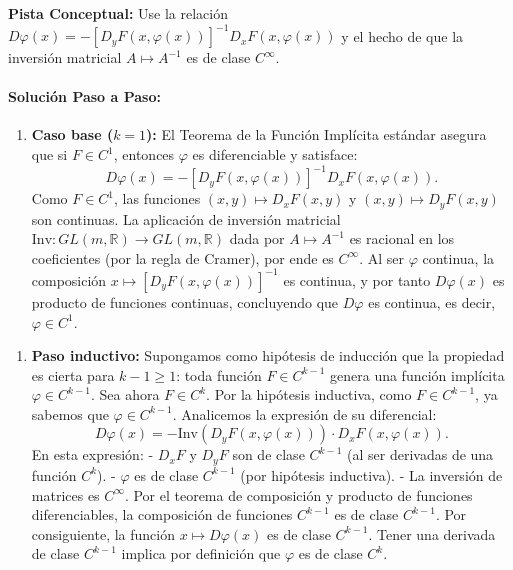 \documentclass[11pt,a4paper]{article}
\begin{document}
\begin{tcolorbox}[colback=yellow!4,colframe=accentamber!70,arc=1mm,boxrule=0.5pt,left=3mm,right=3mm,top=1.5mm,bottom=1.5mm]
\textbf{Pista Conceptual:} Use la relación $D\varphi(x) = -[D_y F(x, \varphi(x))]^{-1} D_x F(x, \varphi(x))$ y el hecho de que la inversión matricial $A \mapsto A^{-1}$ es de clase $C^\infty$.
\end{tcolorbox}

\paragraph{Solución Paso a Paso:}\par
\begin{enumerate}[label=\textbf{\arabic*.}]
\item \textbf{Caso base ($k = 1$):}
El Teorema de la Función Implícita estándar asegura que si $F \in C^1$, entonces $\varphi$ es diferenciable y satisface:
\begin{equation*}
D\varphi(x) = - [D_y F(x, \varphi(x))]^{-1} D_x F(x, \varphi(x)).
\end{equation*}
Como $F \in C^1$, las funciones $(x,y) \mapsto D_x F(x,y)$ y $(x,y) \mapsto D_y F(x,y)$ son continuas.
La aplicación de inversión matricial $\text{Inv}: GL(m, \mathbb{R}) \to GL(m, \mathbb{R})$ dada por $A \mapsto A^{-1}$ es racional en los coeficientes (por la regla de Cramer), por ende es $C^\infty$.
Al ser $\varphi$ continua, la composición $x \mapsto [D_y F(x, \varphi(x))]^{-1}$ es continua, y por tanto $D\varphi(x)$ es producto de funciones continuas, concluyendo que $D\varphi$ es continua, es decir, $\varphi \in C^1$.
\end{enumerate}

\begin{enumerate}[label=\textbf{\arabic*.}]
\item \textbf{Paso inductivo:}
Supongamos como hipótesis de inducción que la propiedad es cierta para $k-1 \ge 1$: toda función $F \in C^{k-1}$ genera una función implícita $\varphi \in C^{k-1}$.
Sea ahora $F \in C^k$. Por la hipótesis inductiva, como $F \in C^{k-1}$, ya sabemos que $\varphi \in C^{k-1}$.
Analicemos la expresión de su diferencial:
\begin{equation*}
D\varphi(x) = - \text{Inv}(D_y F(x, \varphi(x))) \cdot D_x F(x, \varphi(x)).
\end{equation*}
En esta expresión:
- $D_x F$ y $D_y F$ son de clase $C^{k-1}$ (al ser derivadas de una función $C^k$).
- $\varphi$ es de clase $C^{k-1}$ (por hipótesis inductiva).
- La inversión de matrices es $C^\infty$.
Por el teorema de composición y producto de funciones diferenciables, la composición de funciones $C^{k-1}$ es de clase $C^{k-1}$.
Por consiguiente, la función $x \mapsto D\varphi(x)$ es de clase $C^{k-1}$.
Tener una derivada de clase $C^{k-1}$ implica por definición que $\varphi$ es de clase $C^k$.
\end{enumerate}
\end{document}
